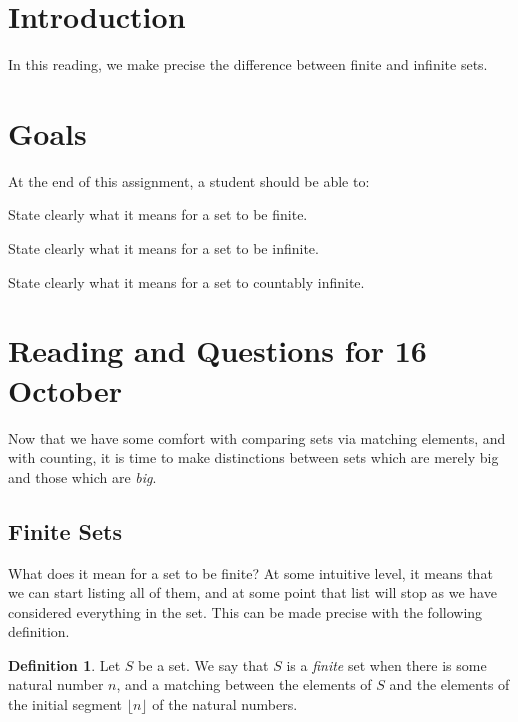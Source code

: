 \documentclass[12pt,letterpaper]{article}
\theoremstyle{definition}
\newtheorem*{definition}{Definition}
\begin{document}
\setlength{\parskip}{1ex plus 0.5ex minus 0.2ex}
\setlength{\parindent}{0pt}

\pagestyle{fancy}
\cfoot{}

\section*{Introduction}
In this reading, we make precise the difference between finite and infinite sets.

\section*{Goals}
At the end of this assignment, a student should be able to:
\begin{compactitem}
\item State clearly what it means for a set to be finite.
\item State clearly what it means for a set to be infinite.
\item State clearly what it means for a set to countably infinite.
\end{compactitem}


\section*{Reading and Questions for 16 October}

Now that we have some comfort with comparing sets via matching elements, and with counting, it is time to make distinctions between sets which are merely big and those which are \emph{big}.

\subsection*{Finite Sets}

What does it mean for a set to be finite?
At some intuitive level, it means that we can start listing all of them, and at some point that list will stop as we have considered everything in the set. 
This can be made precise with the following definition.
\begin{definition}
Let $S$ be a set. We say that $S$ is a \emph{finite} set when there is some natural number $n$, and a matching between the elements of $S$ and the elements of the initial segment $\lfloor n \rfloor$ of the natural numbers.
\end{definition}
\end{document}
